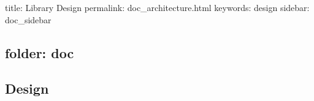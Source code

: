 

 title\+: Library Design permalink\+: doc\+\_\+architecture.\+html keywords\+: design sidebar\+: doc\+\_\+sidebar \subsection*{folder\+: doc }

\subsection*{Design}